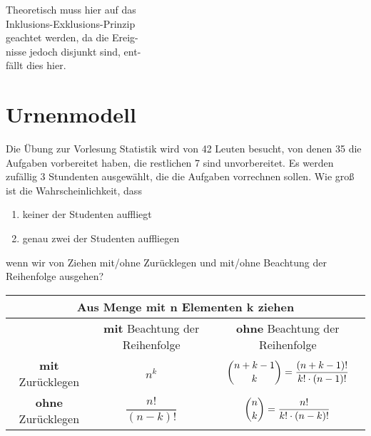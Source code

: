 \documentclass[11pt, a4paper]{article}
\begin{document}
\begin{enumerate}[label=\alph*)]
	\begin{flushright}Theoretisch muss hier auf das\\ Inklusions-Exklusions-Prinzip\\ geachtet werden, da die Ereig-\\nisse jedoch disjunkt sind, ent-\\fällt dies hier.\hspace{2.8cm}\textcolor{white}{.}\end{flushright}

\end{enumerate}

\newpage
\section{Urnenmodell} %


Die Übung zur Vorlesung Statistik wird von 42 Leuten besucht, von denen 35 die Aufgaben vorbereitet haben, die restlichen 7 sind unvorbereitet. Es werden zufällig 3 Stundenten ausgewählt, die die Aufgaben vorrechnen sollen. Wie groß ist die Wahrscheinlichkeit, dass
\begin{enumerate}
	\item keiner der Studenten auffliegt
	\item genau zwei der Studenten auffliegen
\end{enumerate}
wenn wir von Ziehen mit/ohne Zurücklegen und mit/ohne Beachtung der Reihenfolge ausgehen?

\vspace{\baselineskip}
\begin{tabular}{|c||c|c|}
	\hline
	\multicolumn{3}{|c|}{Aus Menge mit \textbf{n} Elementen \textbf{k} ziehen} \\
	\hline
	 & \textbf{mit} Beachtung der Reihenfolge & \textbf{ohne} Beachtung der Reihenfolge \\
	\hline \hline
	\textbf{mit} Zurücklegen & $n^k$ & $\dbinom{n+k-1}{k} = \dfrac{(n+k-1)!}{k!\cdot (n-1)!}$ \\
	\hline
	\textbf{ohne} Zurücklegen & $\dfrac{n!}{(n-k)!}$ & $\dbinom{n}{k} = \dfrac{n!}{k!\cdot (n-k)!}$ \\
\hline
\end{tabular}
\end{document}
